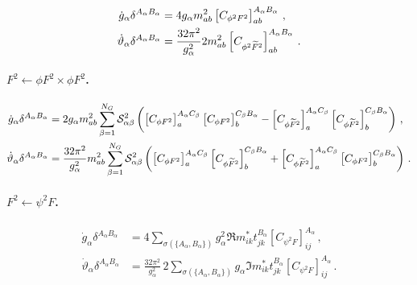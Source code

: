 \begin{align}
    \dot g_\alpha \delta^{A_\alpha B_\alpha} &= 4 g_\alpha  m^2_{ab} \left[C_{\phi^2F^2}\right]_{ab}^{A_\alpha B_\alpha}\,,
    \label{eq:g_phi2F2}
\\
    \dot\vartheta_\alpha\delta^{A_\alpha B_\alpha} &= \frac{32\pi^2}{g_\alpha^2} 2 m^2_{ab} \left[C_{\phi^2\widetilde{F}^2}\right]_{ab}^{A_\alpha B_\alpha}\,.
    \label{eq:theta_phi2F2}
\end{align}

\paragraph{\texorpdfstring{$F^2\leftarrow \phi F^2 \times \phi F^2$}{F2fromphiF2xphiF2}.}

\begin{align}
    \dot g_\alpha \delta^{A_\alpha B_\alpha} &= 2 g_\alpha m^2_{ab}\sum_{\beta=1}^{N_G} \mathcal S_{\alpha\beta}^2
    \left(
    \left[C_{\phi F^2} \right]^{A_\alpha C_\beta }_a \left[C_{\phi F^2} \right]^{C_\beta B_\alpha }_b
    -
    \left[C_{\phi \widetilde F^2} \right]^{A_\alpha C_\beta }_a \left[C_{\phi \widetilde F^2} \right]^{C_\beta B_\alpha }_b
    \right)\,,
    \label{eq:F2<-phiF2xphiF2}
\\
    \dot\vartheta_\alpha \delta^{A_\alpha B_\alpha} &= \frac{32\pi^2}{g_\alpha^2}
     m^2_{ab} \sum_{\beta=1}^{N_G} \mathcal S_{\alpha\beta}^2
    \left(
    \left[C_{\phi F^2} \right]^{A_\alpha C_\beta }_a \left[C_{\phi \widetilde{F}^2} \right]^{C_\beta B_\alpha }_b
    +
    \left[C_{\phi \widetilde F^2} \right]^{A_\alpha C_\beta }_a \left[C_{\phi F^2} \right]^{C_\beta B_\alpha }_b
    \right)\,.
    \label{eq:Ftilde2<-phiF2xphiF2}
\end{align}

\paragraph{$F^2 \leftarrow \psi^2 F$.}

\begin{align}
    \dot g_\alpha \delta^{A_\alpha B_\alpha} &= 4\sum_{\sigma(\{A_\alpha,B_\alpha\})}
     g_\alpha^2 \Re{
     m^*_{ik}t^{B_\alpha}_{jk}
    \left[C_{\psi^2 F}\right]_{ij}^{A_\alpha}
    }
    \,,\label{g_psi2F}
    \\
    \dot \vartheta_\alpha \delta^{A_\alpha B_\alpha} &= \frac{32\pi^2}{g_\alpha^2} \,2\sum_{\sigma(\{A_\alpha,B_\alpha\})}
     g_\alpha \Im{
     m^*_{ik}t^{B_\alpha}_{jk}
    \left[C_{\psi^2 F}\right]_{ij}^{A_\alpha}
    }
    \,.\label{theta_psi2F}
\end{align}

